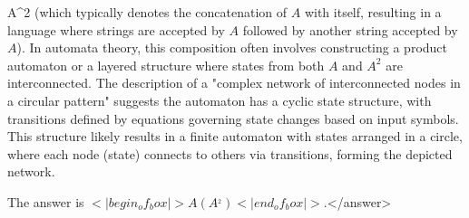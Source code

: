 A^2 \) (which typically denotes the concatenation of \( A \) with itself, resulting in a language where strings are accepted by \( A \) followed by another string accepted by \( A \)). In automata theory, this composition often involves constructing a product automaton or a layered structure where states from both \( A \) and \( A^2 \) are interconnected. The description of a "complex network of interconnected nodes in a circular pattern" suggests the automaton has a cyclic state structure, with transitions defined by equations governing state changes based on input symbols. This structure likely results in a finite automaton with states arranged in a circle, where each node (state) connects to others via transitions, forming the depicted network.  

The answer is \(<|begin_of_box|>A(A^_2)<|end_of_box|>\).</answer>